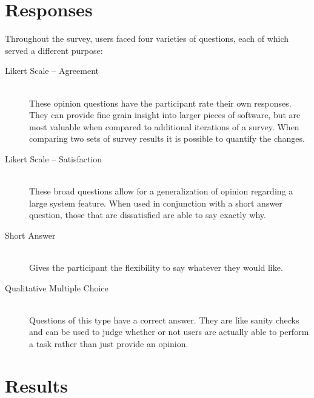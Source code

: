 \section{Responses}
Throughout the survey, users faced four varieties of questions, each of which served a different purpose:

\begin{description}
	\item [Likert Scale -- Agreement] \hfill \\ These opinion questions have the participant rate their own responses. They can provide fine grain insight into larger pieces of software, but are most valuable when compared to additional iterations of a survey. When comparing two sets of survey results it is possible to quantify the changes.
	\item [Likert Scale -- Satisfaction] \hfill \\ These broad questions allow for a generalization of opinion regarding a large system feature. When used in conjunction with a short answer question, those that are dissatisfied are able to say exactly why.
	\item [Short Answer] \hfill \\ Gives the participant the flexibility to say whatever they would like.
	\item [Qualitative Multiple Choice] \hfill \\ Questions of this type have a correct answer. They are like sanity checks and can be used to judge whether or not users are actually able to perform a task rather than just provide an opinion.
\end{description}

\section{Results}


